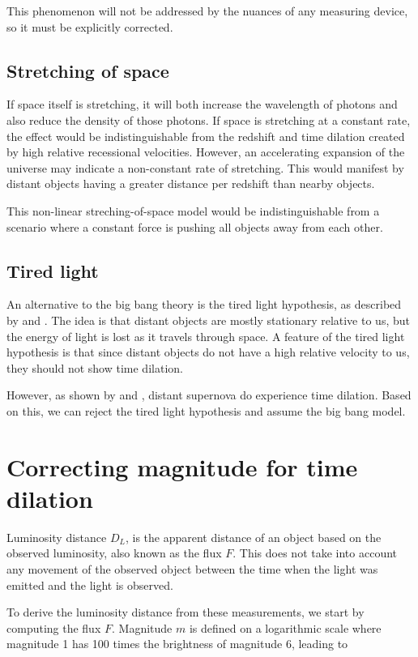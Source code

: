 \documentclass{article}
\begin{document}
This phenomenon will not be addressed by the nuances of any measuring device,
so it must be explicitly corrected.

\subsection{Stretching of space}

If space itself is stretching, it will both increase the wavelength of photons
and also reduce the density of those photons. If space is stretching at a
constant rate, the effect would be indistinguishable from the redshift and time
dilation created by high relative recessional velocities. However, an
accelerating expansion of the universe may indicate a non-constant rate of
stretching. This would manifest by distant objects having a greater distance
per redshift than nearby objects.

This non-linear streching-of-space model would be indistinguishable from a
scenario where a constant force is pushing all objects away from each other.

\subsection{Tired light}

An alternative to the big bang theory is the tired light hypothesis, as
described by \citet{zwicky1929} and \citet{shao2013}. The idea is that distant
objects are mostly stationary relative to us, but the energy of light is lost
as it travels through space. A feature of the tired light hypothesis is that
since distant objects do not have a high relative velocity to us, they should
not show time dilation.

However, as shown by \citet{blonden2008} and \citet{white2024}, distant
supernova do experience time dilation. Based on this, we can reject the tired
light hypothesis and assume the big bang model.

\section{Correcting magnitude for time dilation}

Luminosity distance $D_L$, is the apparent distance of an object based on the
observed luminosity, also known as the flux $F$. This does not take into
account any movement of the observed object between the time when the light was
emitted and the light is observed.

To derive the luminosity distance from these measurements, we start
by computing the flux $F$. Magnitude $m$ is defined on a logarithmic scale
where magnitude 1 has 100 times the brightness of magnitude 6, leading to
\end{document}
